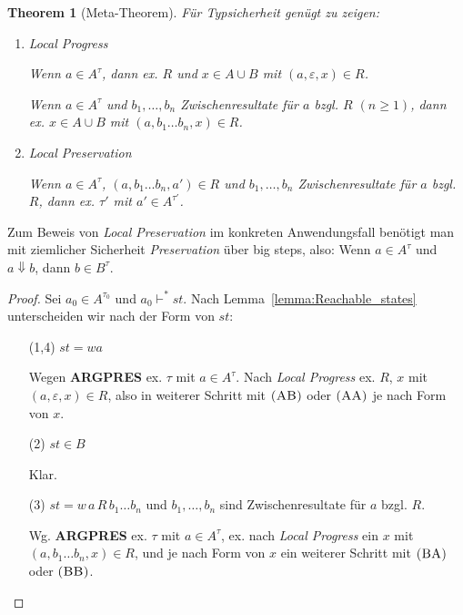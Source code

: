 \documentclass[12pt,a2paper,draft]{article}
\newcommand{\rn}[1]{\mbox{\ensuremath{\textsc{(#1)}}}}
\newtheorem{theorem}{Theorem}
\begin{document}
\begin{theorem}[Meta-Theorem]
  F\"ur Typsicherheit gen\"ugt zu zeigen:
  \begin{enumerate}
  \item \emph{Local Progress}

    Wenn $a \in A^\tau$, dann ex. $R$ und $x \in A \cup B$ mit $(a,\varepsilon,x) \in R$.

    Wenn $a \in A^\tau$ und $b_1,\ldots,b_n$ Zwischenresultate f\"ur $a$ bzgl. $R$ $(n \ge 1)$,
    dann ex. $x \in A \cup B$ mit $(a,b_1 \ldots b_n,x) \in R$.

  \item \emph{Local Preservation}

    Wenn $a \in A^\tau$, $(a,b_1 \ldots b_n,a') \in R$ und $b_1,\ldots,b_n$ Zwischenresultate
    f\"ur $a$ bzgl. $R$, dann ex. $\tau'$ mit $a' \in A^{\tau'}$.
  \end{enumerate}
\end{theorem}

\noindent
Zum Beweis von \emph{Local Preservation} im konkreten Anwendungsfall ben\"otigt man mit ziemlicher
Sicherheit \emph{Preservation} \"uber big steps, also: Wenn $a \in A^\tau$ und $a \Downarrow b$,
dann $b \in B^\tau$.

\begin{proof}
  Sei $a_0 \in A^{\tau_0}$ und $a_0 \vdash^* st$. Nach Lemma~\ref{lemma:Reachable_states} unterscheiden wir
  nach der Form von $st$:
  \begin{enumerate}
  \item[(1,4)] $st = wa$

    Wegen \textbf{ARGPRES} ex. $\tau$ mit $a \in A^\tau$. Nach \emph{Local Progress} ex. $R$, $x$
    mit $(a,\varepsilon,x) \in R$, also in weiterer Schritt mit \rn{AB} oder \rn{AA} je nach Form
    von $x$.

  \item[(2)] $st \in B$

    Klar.

  \item[(3)] $st = w\,a\,R\,b_1 \ldots b_n$ und $b_1,\ldots,b_n$ sind Zwischenresultate f\"ur $a$ bzgl.
    $R$.

    Wg. \textbf{ARGPRES} ex. $\tau$ mit $a \in A^\tau$, ex. nach \emph{Local Progress} ein $x$ mit
    $(a,b_1 \ldots b_n,x) \in R$, und je nach Form von $x$ ein weiterer Schritt mit \rn{BA} oder \rn{BB}.
  \end{enumerate}
\end{proof}
\end{document}
